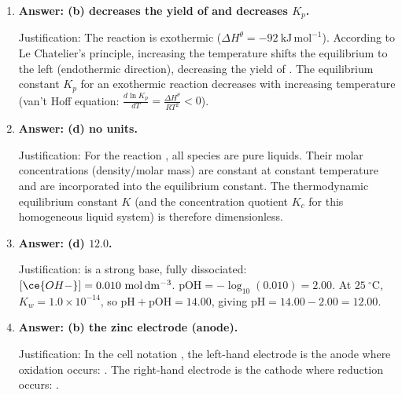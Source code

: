 \documentclass[11pt]{article}
\begin{document}
\begin{corrige}
\begin{enumerate}
\item \textbf{Answer: (b) decreases the yield of  and decreases $K_p$.}
\par Justification: The reaction  is exothermic ($\Delta H^\theta = -92\ \mathrm{kJ\,mol^{-1}}$). According to Le Chatelier's principle, increasing the temperature shifts the equilibrium to the left (endothermic direction), decreasing the yield of . The equilibrium constant $K_p$ for an exothermic reaction decreases with increasing temperature (van't Hoff equation: $\frac{d\ln K_p}{dT} = \frac{\Delta H^\theta}{RT^2} < 0$).
\item \textbf{Answer: (d) no units.}
\par Justification: For the reaction , all species are pure liquids. Their molar concentrations (density/molar mass) are constant at constant temperature and are incorporated into the equilibrium constant. The thermodynamic equilibrium constant $K$ (and the concentration quotient $K_c$ for this homogeneous liquid system) is therefore dimensionless.
\item \textbf{Answer: (d) $12.0$.}
\par Justification:  is a strong base, fully dissociated: $[\ce{OH-}] = 0.010\ \mathrm{mol\,dm^{-3}}$. $\mathrm{pOH} = -\log_{10}(0.010) = 2.00$. At $25\ ^\circ\mathrm{C}$, $K_w = 1.0\times 10^{-14}$, so $\mathrm{pH} + \mathrm{pOH} = 14.00$, giving $\mathrm{pH} = 14.00 - 2.00 = 12.00$.
\item \textbf{Answer: (b) the zinc electrode (anode).}
\par Justification: In the cell notation , the left-hand electrode is the anode where oxidation occurs: . The right-hand electrode is the cathode where reduction occurs: .
\end{enumerate}
\end{corrige}
\end{document}
